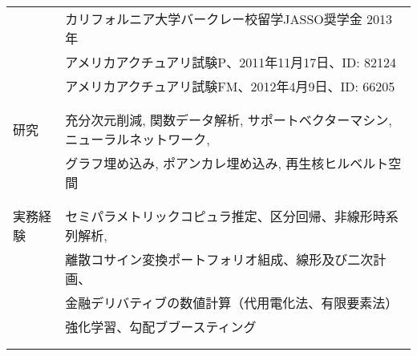 \documentclass[utf8,letterpaper,oneside]{article}
\begin{document}
\begin{center}
\begin{tabular}{l l}
             & カリフォルニア大学バークレー校留学JASSO奨学金 2013年                                                           \\
             & アメリカアクチュアリ試験P、2011年11月17日、ID: 82124                                                           \\
             & アメリカアクチュアリ試験FM、2012年4月9日、ID: 66205                                                            \\
             &                                                                                                                \\ \hline
             &                                                                                                                \\
  研究       & 充分次元削減, 関数データ解析, サポートベクターマシン,ニューラルネットワーク,                                   \\
             & グラフ埋め込み, ポアンカレ埋め込み, 再生核ヒルベルト空間                                                       \\
             &                                                                                                                \\ \hline
             &                                                                                                                \\
  実務経験   & セミパラメトリックコピュラ推定、区分回帰、非線形時系列解析,                                                    \\
             & 離散コサイン変換ポートフォリオ組成、線形及び二次計画、                                                         \\
             & 金融デリバティブの数値計算（代用電化法、有限要素法）                                                           \\
             & 強化学習、勾配ブブースティング                                                                                 \\
             &                                                                                                                \\ \hline
             &                                                                                                                \\

\end{tabular}
\end{center}
\end{document}
